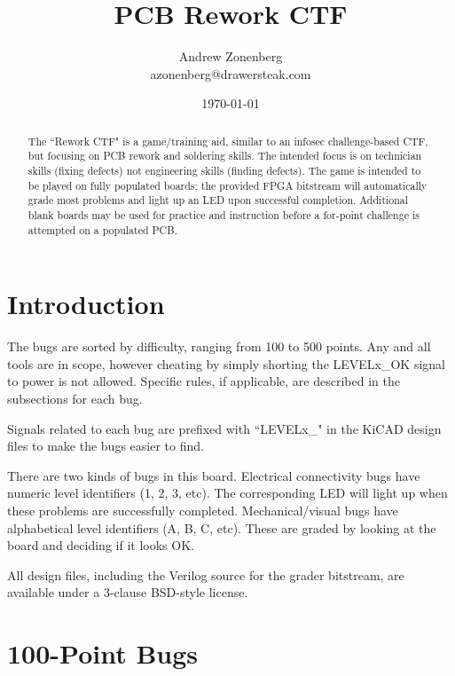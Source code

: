 \documentclass{article}
\begin{document}
\title{\vspace*{\fill}PCB Rework CTF}
\author{Andrew Zonenberg\\
azonenberg@drawersteak.com}
\date{\today}

\maketitle
\begin{abstract}
The ``Rework CTF" is a game/training aid, similar to an infosec challenge-based CTF, but focusing on PCB rework and
soldering skills. The intended focus is on technician skills (fixing defects) not engineering skills (finding defects).
The game is intended to be played on fully populated boards; the provided FPGA bitstream will automatically grade most
problems and light up an LED upon successful completion. Additional blank boards may be used for practice and
instruction before a for-point challenge is attempted on a populated PCB.
\end{abstract}
\thispagestyle{empty}

\pagebreak

\tableofcontents

\pagebreak
\section{Introduction}

The bugs are sorted by difficulty, ranging from 100 to 500 points. Any and all tools are in scope, however cheating by
simply shorting the LEVELx\_OK signal to power is not allowed. Specific rules, if applicable, are described in the
subsections for each bug.

Signals related to each bug are prefixed with ``LEVELx\_" in the KiCAD design files to make the bugs easier to find.

There are two kinds of bugs in this board. Electrical connectivity bugs have numeric level identifiers (1, 2, 3, etc).
The corresponding LED will light up when these problems are successfully completed. Mechanical/visual bugs have
alphabetical level identifiers (A, B, C, etc). These are graded by looking at the board and deciding if it looks OK.

All design files, including the Verilog source for the grader bitstream, are available under a 3-clause BSD-style
license.

\pagebreak
\section{100-Point Bugs}
\end{document}
